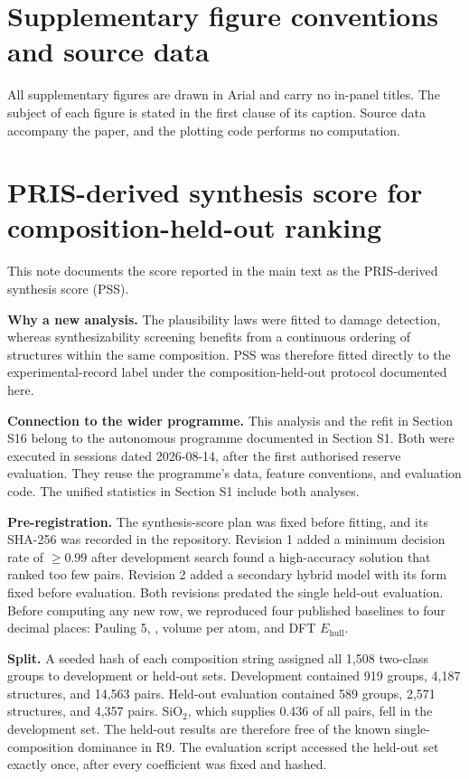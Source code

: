 \section{Supplementary figure conventions and source data}\label{note:s14}

All supplementary figures are drawn in Arial and carry no in-panel titles. The subject of
each figure is stated in the first clause of its caption. Source data accompany the paper, and the plotting code performs no computation.

\section{PRIS-derived synthesis score for composition-held-out ranking}\label{note:s15}

This note documents the score reported in the main text as the PRIS-derived synthesis score
(PSS).

\textbf{Why a new analysis.} The plausibility laws were fitted to damage detection,
whereas synthesizability screening benefits from a continuous ordering of structures
within the same composition. PSS was therefore fitted directly to the
experimental-record label under the composition-held-out protocol documented here.

\textbf{Connection to the wider programme.} This analysis and the refit in Section
S16 belong to the autonomous programme documented in Section S1. Both were executed
in sessions dated 2026-08-14, after the first authorised reserve evaluation.
They reuse the programme's data, feature conventions, and evaluation code. The
unified statistics in Section S1 include both analyses.

\textbf{Pre-registration.} The synthesis-score plan was fixed before fitting, and
its SHA-256 was recorded in the repository. Revision 1 added a minimum decision
rate of $\geq0.99$ after development search found a high-accuracy solution that
ranked too few pairs. Revision 2 added a secondary hybrid model with its form
fixed before evaluation. Both revisions predated the single held-out evaluation.
Before computing any new row, we reproduced four published baselines to four
decimal places: Pauling 5, \rhoc{}, volume per atom, and DFT
$E_{\mathrm{hull}}$.

\textbf{Split.} A seeded hash of each composition string assigned all 1{,}508
two-class groups to development or held-out sets. Development contained 919
groups, 4{,}187 structures, and 14{,}563 pairs. Held-out evaluation contained 589
groups, 2{,}571 structures, and 4{,}357 pairs. SiO$_2$, which supplies 0.436 of
all pairs, fell in the development set. The held-out results are therefore free
of the known single-composition dominance in R9. The evaluation script accessed
the held-out set exactly once, after every coefficient was fixed and hashed.

